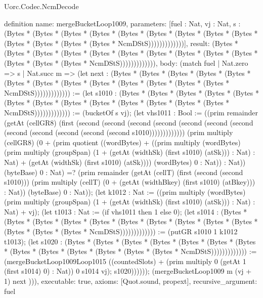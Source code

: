 \begin{lexlean}{Uorc.Codec.NcmDecode}
\begin{semanticmodule}
definition{
  name: mergeBucketLoop1009,
  parameters: [fuel : Nat, vj : Nat, s : (Bytes * (Bytes * (Bytes * (Bytes * (Bytes * (Bytes * (Bytes * (Bytes * (Bytes * (Bytes * (Bytes * (Bytes * (Bytes * NcmDStS)))))))))))))],
  result: (Bytes * (Bytes * (Bytes * (Bytes * (Bytes * (Bytes * (Bytes * (Bytes * (Bytes * (Bytes * (Bytes * (Bytes * (Bytes * NcmDStS))))))))))))),
  body: (match fuel
    | Nat.zero => s
    | Nat.succ m => (let next : (Bytes * (Bytes * (Bytes * (Bytes * (Bytes * (Bytes * (Bytes * (Bytes * (Bytes * (Bytes * (Bytes * (Bytes * (Bytes * NcmDStS))))))))))))) := (let s1010 : (Bytes * (Bytes * (Bytes * (Bytes * (Bytes * (Bytes * (Bytes * (Bytes * (Bytes * (Bytes * (Bytes * (Bytes * (Bytes * NcmDStS))))))))))))) := (bucketOf s vj); (let vhs1011 : Bool := ((prim remainder (getAt (cellGR8) (first (second (second (second (second (second (second (second (second (second (second (second (second s1010))))))))))))) (prim multiply (cellGR8) (0 + (prim quotient ((wordBytes) + ((prim multiply (wordBytes) (prim multiply (groupSpan) (1 + (getAt (widthSk) (first s1010) (atSk))) : Nat) : Nat) + (getAt (widthSk) (first s1010) (atSk)))) (wordBytes) 0 : Nat)) : Nat)) (byteBase) 0 : Nat) =? (prim remainder (getAt (cellT) (first (second (second s1010))) (prim multiply (cellT) (0 + (getAt (widthBkey) (first s1010) (atBkey))) : Nat)) (byteBase) 0 : Nat)); (let k1012 : Nat := ((prim multiply (wordBytes) (prim multiply (groupSpan) (1 + (getAt (widthSk) (first s1010) (atSk))) : Nat) : Nat) + vj); (let t1013 : Nat := (if vhs1011 then 1 else 0); (let s1014 : (Bytes * (Bytes * (Bytes * (Bytes * (Bytes * (Bytes * (Bytes * (Bytes * (Bytes * (Bytes * (Bytes * (Bytes * (Bytes * NcmDStS))))))))))))) := (putGR s1010 1 k1012 t1013); (let s1020 : (Bytes * (Bytes * (Bytes * (Bytes * (Bytes * (Bytes * (Bytes * (Bytes * (Bytes * (Bytes * (Bytes * (Bytes * (Bytes * NcmDStS))))))))))))) := (mergeBucketLoop1009Loop1015 ((countedSlots) + (prim multiply 0 (getAt 1 (first s1014) 0) : Nat)) 0 s1014 vj); s1020)))))); (mergeBucketLoop1009 m (vj + 1) next ))),
  executable: true,
  axioms: [Quot.sound, propext],
  recursive_argument: fuel
}


\end{semanticmodule}
\end{lexlean}
